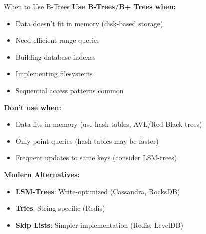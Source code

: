 \documentclass[aspectratio=169]{beamer}
\begin{document}
\begin{frame}{When to Use B-Trees}
  \textbf{Use B-Trees/B+ Trees when:}
  \begin{itemize}
    \item Data doesn't fit in memory (disk-based storage)
    \item Need efficient range queries
    \item Building database indexes
    \item Implementing filesystems
    \item Sequential access patterns common
  \end{itemize}

  \vspace{0.3cm}
  \textbf{Don't use when:}
  \begin{itemize}
    \item Data fits in memory (use hash tables, AVL/Red-Black trees)
    \item Only point queries (hash tables may be faster)
    \item Frequent updates to same keys (consider LSM-trees)
  \end{itemize}

  \vspace{0.3cm}
  \textbf{Modern Alternatives:}
  \begin{itemize}
    \item \textbf{LSM-Trees}: Write-optimized (Cassandra, RocksDB)
    \item \textbf{Tries}: String-specific (Redis)
    \item \textbf{Skip Lists}: Simpler implementation (Redis, LevelDB)
  \end{itemize}
\end{frame}
\end{document}
